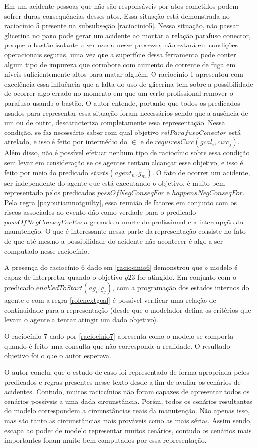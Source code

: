 Em um acidente pessoas que não são responsáveis por atos cometidos podem sofrer duras consequências desses atos. Essa situação está demonstrada no raciocínio 5 presente na subsubseção \ref{raciocinio5}. Nessa situação, não passar glicerina no pano pode gerar um acidente ao montar a relação parafuso conector, porque o bastão isolante a ser usado nesse  processo, não estará em condições operacionais seguras, uma vez que a superfície dessa ferramenta pode conter algum tipo de impureza que corrobore com aumento de corrente de fuga em níveis suficientemente altos para matar alguém. O raciocínio 1 apresentou com excelência essa influência que a falta do uso de glicerina tem sobre a possibilidade de ocorrer algo errado no momento em que um certo profissional remover o parafuso usando o bastão. O autor entende, portanto que todos os predicados usados para representar essa situação foram necessários sendo que a ausência de um ou de outro, descaracteriza completamente essa representação. Nessa condição, se faz necessário saber com qual objetivo $relParafusoConector$ está atrelado, e isso é feito por intermédio do $\in$ e de $requiresCirc(goal_i,circ_j)$. Além disso, não é possível efetuar nenhum tipo de raciocínio sobre essa condição sem levar em consideração se os agentes tentam alcançar esse objetivo, e isso é feito por meio do predicado $starts(agent_n,g_m)$. O fato de ocorrer um acidente, ser independente do agente que está executando o objetivo, é muito bem representado pelos predicados $possOfNegConseqFor$ e $happensNegConseqFor$. Pela regra \ref{paybutiamnotguilty}, essa reunião de fatores em conjunto com os riscos associados ao evento dão como verdade para o predicado $possOfNegConseqForEven$ gerando a morte do profissional e a interrupção da manutenção. O que é interessante nessa parte da representação consiste no fato de que até mesmo a possibilidade do acidente não acontecer é algo a ser computado nesse raciocínio. 

A presença do raciocínio 6 dado em \ref{raciocinio6} demonstrou que o modelo é capaz de interpretar quando o objetivo $g23$ for atingido. Em conjunto com o predicado $enabledToStart(ag_i,g_j)$, com a programação dos estados internos do agente e com a regra \ref{rolenextgoal} é possível verificar uma relação de continuidade para a representação (desde que o modelador defina os critérios que levam o agente a tentar atingir um dado objetivo). 

O raciocínio 7 dado por \ref{raciocinio7} apresenta como o modelo se comporta quando é feito uma consulta que não corresponde a realidade. O resultado objetivo foi o que o autor esperava. 

O autor conclui que o estudo de caso foi representado de forma apropriada pelos predicados e regras presentes nesse texto desde a fim de avaliar os cenários de acidentes. Contudo, muitos raciocínios não foram capazes de apresentar todos os cenários possíveis a uma dada circunstância. Porém, todos os cenários resultantes do modelo correspondem a circunstâncias reais da manutenção. Não apenas isso, mas são tanto as circunstâncias mais prováveis como as mais sérias. Assim sendo, escapa ao poder de modelo representar muitos cenários, contudo os cenários mais importantes foram muito bem computados por essa representação.